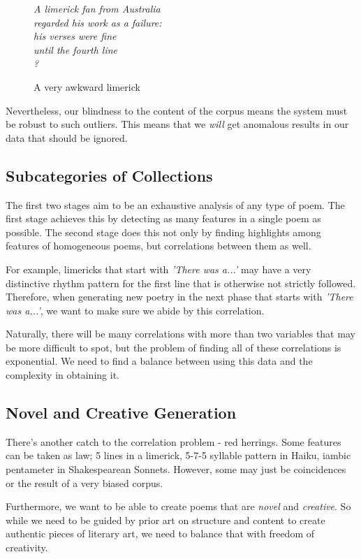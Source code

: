 \begin{figure}[h!]
\centering
\textit{
A limerick fan from Australia\\
regarded his work as a failure:\\
his verses were fine\\
until the fourth line\\
?
}
\caption{A very awkward limerick}
\label{fig:awkward-limerick}
\end{figure}
Nevertheless, our blindness to the content of the corpus means the system must be robust to such outliers. This means that we \textit{will} get anomalous results in our data that should be ignored.

\subsection{Subcategories of Collections}

The first two stages aim to be an exhaustive analysis of any type of poem. The first stage achieves this by detecting as many features in a single poem as possible. The second stage does this not only by finding highlights among features of homogeneous poems, but correlations between them as well.

For example, limericks that start with \textit{'There was a...'} may have a very distinctive rhythm pattern for the first line that is otherwise not strictly followed. Therefore, when generating new poetry in the next phase that starts with \textit{'There was a...'}, we want to make sure we abide by this correlation.

Naturally, there will be many correlations with more than two variables that may be more difficult to spot, but the problem of finding all of these correlations is exponential. We need to find a balance between using this data and the complexity in obtaining it.

\subsection{Novel and Creative Generation}

There's another catch to the correlation problem - red herrings. Some features can be taken as law; 5 lines in a limerick, 5-7-5 syllable pattern in Haiku, iambic pentameter in Shakespearean Sonnets. However, some may just be coincidences or the result of a very biased corpus.

Furthermore, we want to be able to create poems that are \textit{novel} and \textit{creative}. So while we need to be guided by prior art on structure and content to create authentic pieces of literary art, we need to balance that with freedom of creativity. 

